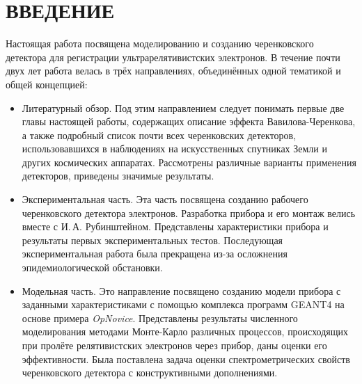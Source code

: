 \documentclass[12pt,a4paper]{report} %
\renewcommand{\thechapter}{\arabic{chapter}.}
\renewcommand{\thesection}{\arabic{chapter}.\arabic{section}.}
\renewcommand{\thesubsection}{\arabic{chapter}.\arabic{section}.\arabic{subsection}.}
\begin{document}
\newpage

\tableofcontents   %





\chapter*{ВВЕДЕНИЕ}
 

Настоящая работа посвящена моделированию и созданию черенковского детектора для регистрации ультрарелятивистских электронов.
В течение почти двух лет работа велась в трёх направлениях, объединённых одной тематикой и общей концепцией:
\begin{itemize}
	\item Литературный обзор. Под этим направлением следует понимать первые две главы настоящей работы, содержащих описание эффекта Вавилова-Черенкова, а также подробный список почти всех черенковских детекторов, использовавшихся в наблюдениях на искусственных спутниках Земли и других космических аппаратах. Рассмотрены различные варианты применения детекторов, приведены значимые  результаты.
	\item Экспериментальная часть. Эта часть посвящена созданию рабочего черенковского детектора электронов. Разработка прибора и его монтаж велись вместе с И.\,А. Рубинштейном. Представлены характеристики прибора и результаты первых экспериментальных тестов. Последующая экспериментальная работа была прекращена из-за осложнения эпидемиологической обстановки.
	\item Модельная часть. Это направление посвящено созданию модели прибора с заданными характеристиками с помощью комплекса программ GEANT4 на основе примера \textit{OpNovice}. Представлены результаты численного моделирования методами Монте-Карло различных процессов, происходящих при пролёте релятивистских электронов через прибор, даны оценки его эффективности. Была поставлена задача оценки спектрометрических свойств черенковского детектора с конструктивными дополнениями. 
\end{itemize}
\end{document}
